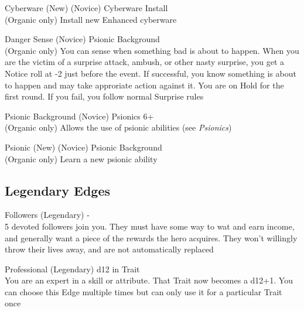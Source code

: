 \begin{multicols}{2}
\begin{genericsection}{Cyberware (New) (Novice)}
Cyberware Install\\
(Organic only) Install new Enhanced cyberware
\end{genericsection}

\begin{genericsection}{Danger Sense (Novice)}
Psionic Background\\
(Organic only) You can sense when something bad is about to happen. When you are the victim of a surprise attack, ambush, or other nasty surprise, you get a Notice roll at -2 just before the event. If successful, you know something is about to happen and may take approriate action against it. You are on Hold for the first round. If you fail, you follow normal Surprise rules
\end{genericsection}

\begin{genericsection}{Psionic Background (Novice)}
Psionics 6+\\
(Organic only) Allows the use of psionic abilities (see \textit{Psionics})
\end{genericsection}

\begin{genericsection}{Psionic (New) (Novice)}
Psionic Background\\
(Organic only) Learn a new psionic ability
\end{genericsection}

%
%
\subsection{Legendary Edges}

\begin{genericsection}{Followers (Legendary)}
-\\
5 devoted followers join you. They must have some way to wat and earn income, and generally want a piece of the rewards the hero acquires. They won't willingly throw their lives away, and are not automatically replaced
\end{genericsection}

\begin{genericsection}{Professional (Legendary)}
d12 in Trait\\
You are an expert in a skill or attribute. That Trait now becomes a d12+1. You can choose this Edge multiple times but can only use it for a particular Trait once
\end{genericsection}


\end{multicols}
